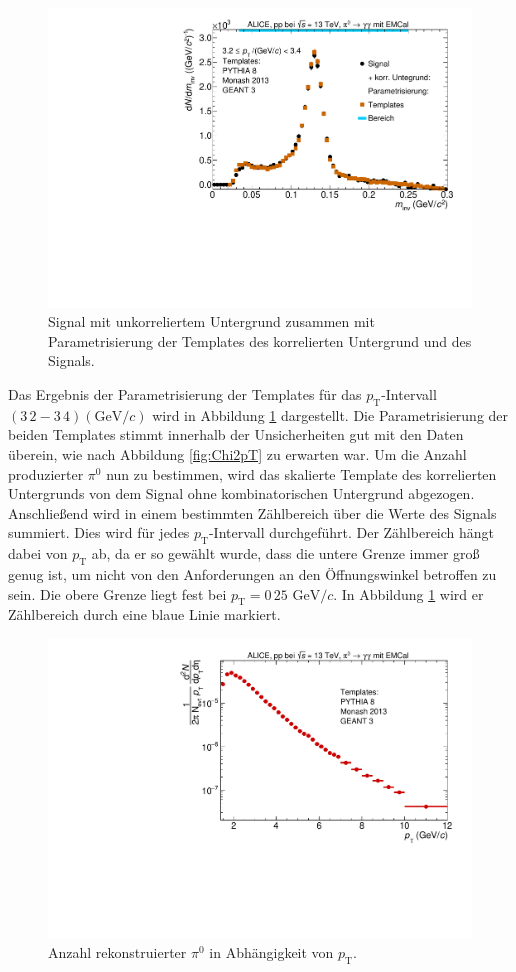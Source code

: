 \begin{figure}[t!]
\centering
\includegraphics[width=.65\linewidth]{ParamResult_Bin10_Data_2016.pdf}
\caption{Signal mit unkorreliertem Untergrund zusammen mit Parametrisierung der Templates des korrelierten Untergrund und des Signals.
}
\label{fig:ParamResult}
\end{figure}
Das Ergebnis der Parametrisierung der Templates für das $p_\text{T}$-Intervall $(3\,2-3\,4)(\text{GeV/}c)$ wird in Abbildung \ref{fig:ParamResult} dargestellt.
Die Parametrisierung der beiden Templates stimmt innerhalb der Unsicherheiten gut mit den Daten überein, wie nach Abbildung \ref{fig:Chi2pT} zu erwarten war.
\newline
Um die Anzahl produzierter $\pi^{0}$ nun zu bestimmen, wird das skalierte Template des korrelierten Untergrunds von dem Signal ohne kombinatorischen Untergrund abgezogen.
Anschließend wird in einem bestimmten Zählbereich über die Werte des Signals summiert.
Dies wird für jedes $p_\text{T}$-Intervall durchgeführt.
\newline
Der Zählbereich hängt dabei von $p_\text{T}$ ab, da er so gewählt wurde, dass die untere Grenze immer groß genug ist, um nicht von den Anforderungen an den Öffnungswinkel betroffen zu sein.
Die obere Grenze liegt fest bei $p_\text{T} = 0\,25 \text{ GeV}/c$.
In Abbildung \ref{fig:ParamResult} wird er Zählbereich durch eine blaue Linie markiert.
\begin{figure}[t!]
\centering
\includegraphics[width=.65\linewidth]{UncorrYields_Data_2016.pdf}
\caption{Anzahl rekonstruierter $\pi^{0}$ in Abhängigkeit von $p_\text{T}$.
}
\label{fig:RawYield}
\end{figure}
